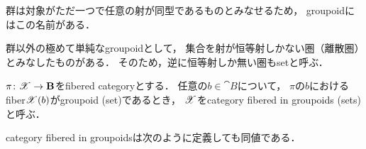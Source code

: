 \documentclass[a4paper, dvipdfmx]{jsarticle}
\begin{document}
    \begin{Remark}
        群は対象がただ一つで任意の射が同型であるものとみなせるため，
        groupoidにはこの名前がある．

        群以外の極めて単純なgroupoidとして，
        集合を射が恒等射しかない圏（離散圏）とみなしたものがある．
        そのため，逆に恒等射しか無い圏もsetと呼ぶ．
    \end{Remark}

    \begin{Def}
        $\pi \colon \mathscr{X} \to \mathbf{B}$をfibered categoryとする．
        任意の$b \in \cat{B}$について，
        $\pi$の$b$におけるfiber$\mathscr{X}(b)$がgroupoid (set)であるとき，
        $\mathscr{X}$をcategory fibered in groupoids (sets)と呼ぶ．
    \end{Def}
    category fibered in groupoidsは次のように定義しても同値である．
\end{document}
